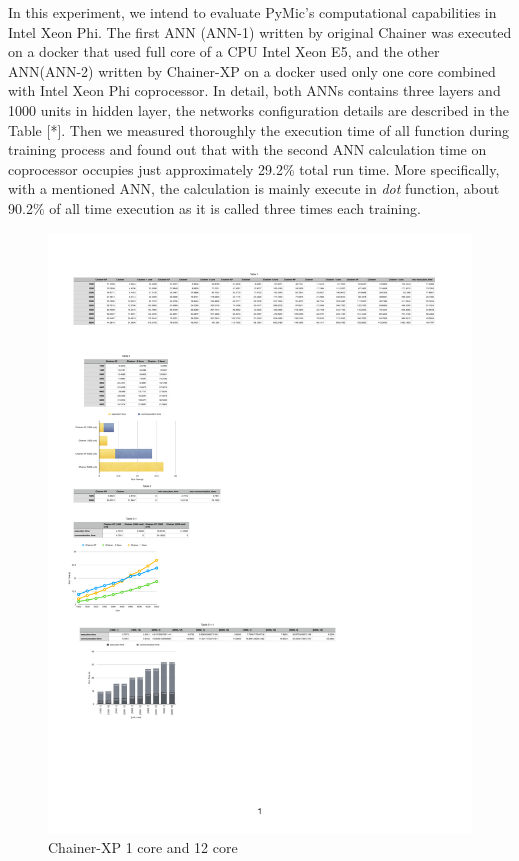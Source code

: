 In this experiment, we intend to evaluate PyMic's computational capabilities in Intel Xeon Phi. The first ANN (ANN-1) written by original Chainer was executed on a docker that used full core of a CPU Intel Xeon E5, and the other ANN(ANN-2) written by Chainer-XP on a docker used only one core combined with Intel Xeon Phi coprocessor. In detail, both ANNs contains three layers and 1000 units in hidden layer, the networks configuration details are described in the Table [*]. Then we measured thoroughly the execution time of all function during training process and found out that with the second ANN calculation time on coprocessor occupies just approximately 29.2\% total run time. More specifically, with a mentioned ANN, the calculation is mainly execute in \textit{dot} function, about 90.2\% of all time execution as it is called three times each training.
\begin{figure}[]
\centering
\includegraphics[scale=0.5]{img/b.pdf}
\caption{Chainer-XP 1 core and 12 core}
\end{figure}

